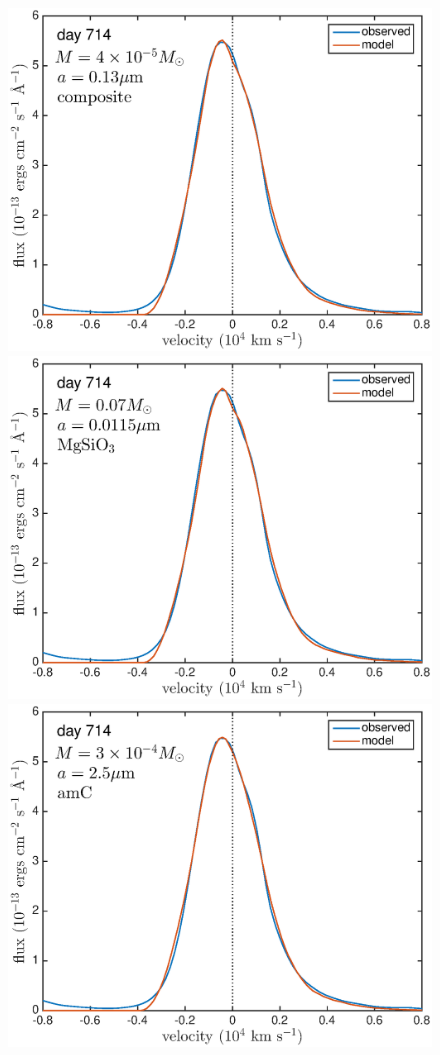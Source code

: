 \documentclass[useAMS,usenatbib,usegraphicx]{mnras}
\begin{document}
\begin{figure}
\includegraphics[trim =0 0 0 -10,clip=true,scale=0.26]{silicates_take2/composite_bestfit_Ha}
\includegraphics[trim =24 0 0 -10,clip=true,scale=0.26]{silicates_take2/MgSiO3_bestfit_Ha}
\includegraphics[trim =24 0 0 -10,clip=true,scale=0.26]{silicates_take2/AmC_bestfit_Ha}

\end{figure}
\end{document}
